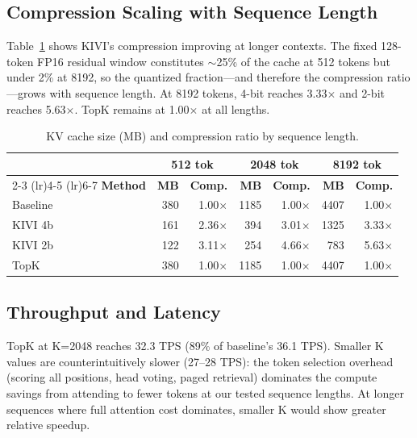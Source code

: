\documentclass[conference]{IEEEtran}
\begin{document}
\subsection{Compression Scaling with Sequence Length}

Table~\ref{tab:seq_scaling} shows KIVI's compression improving at longer contexts. The fixed 128-token FP16 residual window constitutes $\sim$25\% of the cache at 512 tokens but under 2\% at 8192, so the quantized fraction---and therefore the compression ratio---grows with sequence length. At 8192 tokens, 4-bit reaches 3.33$\times$ and 2-bit reaches 5.63$\times$. TopK remains at 1.00$\times$ at all lengths.

\begin{table}[t]
\centering
\caption{KV cache size (MB) and compression ratio by sequence length.}
\label{tab:seq_scaling}
\begin{tabular}{@{}lrrrrrr@{}}
\toprule
 & \multicolumn{2}{c}{\textbf{512 tok}} & \multicolumn{2}{c}{\textbf{2048 tok}} & \multicolumn{2}{c}{\textbf{8192 tok}} \\
\cmidrule(lr){2-3} \cmidrule(lr){4-5} \cmidrule(lr){6-7}
\textbf{Method} & \textbf{MB} & \textbf{Comp.} & \textbf{MB} & \textbf{Comp.} & \textbf{MB} & \textbf{Comp.} \\
\midrule
Baseline & 380 & 1.00$\times$ & 1185 & 1.00$\times$ & 4407 & 1.00$\times$ \\
KIVI 4b & 161 & 2.36$\times$ & 394 & 3.01$\times$ & 1325 & 3.33$\times$ \\
KIVI 2b & 122 & 3.11$\times$ & 254 & 4.66$\times$ & 783 & 5.63$\times$ \\
TopK & 380 & 1.00$\times$ & 1185 & 1.00$\times$ & 4407 & 1.00$\times$ \\
\bottomrule
\end{tabular}
\end{table}

\subsection{Throughput and Latency}

TopK at K=2048 reaches 32.3 TPS (89\% of baseline's 36.1 TPS). Smaller K values are counterintuitively slower (27--28 TPS): the token selection overhead (scoring all positions, head voting, paged retrieval) dominates the compute savings from attending to fewer tokens at our tested sequence lengths. At longer sequences where full attention cost dominates, smaller K would show greater relative speedup.
\end{document}
